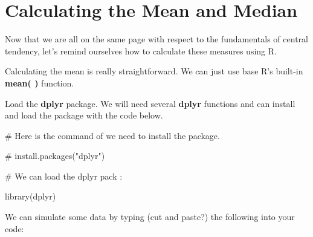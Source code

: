 \documentclass[
  letterpaper,
  DIV=11,
  numbers=noendperiod]{scrreprt}
\newenvironment{Shaded}{\begin{snugshade}}{\end{snugshade}}
\newcommand{\CommentTok}[1]{\textcolor[rgb]{0.37,0.37,0.37}{#1}}
\newcommand{\FunctionTok}[1]{\textcolor[rgb]{0.28,0.35,0.67}{#1}}
\newcommand{\NormalTok}[1]{\textcolor[rgb]{0.00,0.23,0.31}{#1}}
\begin{document}

\chapter*{Calculating the Mean and
Median}\label{calculating-the-mean-and-median}


Now that we are all on the same page with respect to the fundamentals of
central tendency, let's remind ourselves how to calculate these measures
using R.

Calculating the mean is really straightforward. We can just use base R's
built-in \textbf{mean( )} function.

Load the \textbf{dplyr} package. We will need several \textbf{dplyr}
functions and can install and load the package with the code below.

\begin{Shaded}
\begin{Highlighting}[]
\CommentTok{\# Here is the command of we need to install the package. }

\CommentTok{\# install.packages("dplyr")}

\CommentTok{\# We can load the dplyr pack :}

\FunctionTok{library}\NormalTok{(dplyr)}
\end{Highlighting}
\end{Shaded}

We can simulate some data by typing (cut and paste?) the following into
your code:
\end{document}
